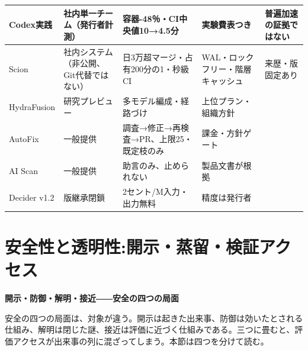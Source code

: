 \documentclass[lualatex,a4paper,10pt]{jlreq}
\begin{document}
\begin{strip}
\centering\footnotesize
{}
\begin{tabularx}{0.96\linewidth}{@{}lXXXX@{}}
\toprule
Codex実践 & 社内単一チーム（発行者計測） & 容器-48％・CI中央値10→4.5分 & 実験費表つき & 普遍加速の証拠ではない \cite{B31} \\
\midrule
Scion & 社内システム（非公開、Git代替ではない） & 日3万超マージ・占有200分の1・秒級CI & WAL・ロックフリー・階層キャッシュ & 来歴・版固定あり \cite{B32,B75} \\
\midrule
HydraFusion & 研究プレビュー & 多モデル編成・経路づけ & 上位プラン・組織方針 \cite{B33,B76} \\
\midrule
AutoFix & 一般提供 & 調査→修正→再検査→PR、上限25・既定枝のみ & 課金・方針ゲート \cite{B34,B77} \\
\midrule
AI Scan & 一般提供 & 助言のみ、止められない & 製品文書が根拠 \cite{B35,B78} \\
\midrule
Decider v1.2 & 版継承閉鎖 & 2セント/M入力・出力無料 & 精度は発行者 \cite{B37,B36,B38} \\
\bottomrule
\end{tabularx}
\end{strip}

\section{安全性と透明性:開示・蒸留・検証アクセス}
\label{sec:P5}
{\Large\bfseries 開示・防御・解明・接近――安全の四つの局面\par}
\bigskip
安全の四つの局面は、対象が違う。開示は起きた出来事、防御は効いたとされる仕組み、解明は閉じた謎、接近は評価に近づく仕組みである。三つに畳むと、評価アクセスが出来事の列に混ざってしまう。本節は四つを分けて読む。
\cite{B40,B79,B41,B80,B42,B81,B39,B82}
\end{document}
